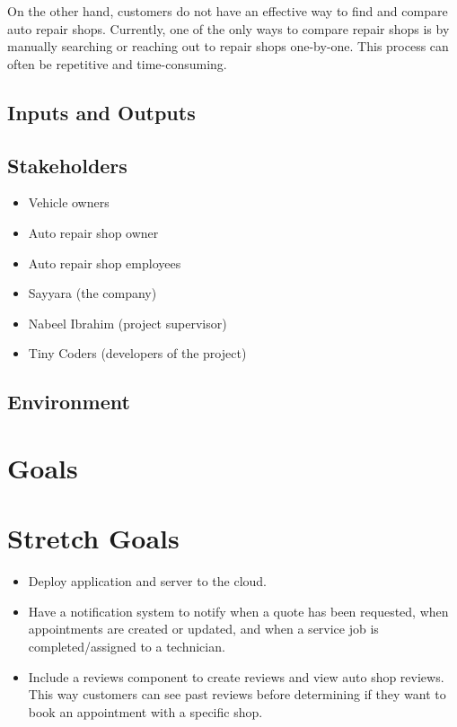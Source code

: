 \documentclass{article}
\begin{document}
On the other hand, customers do not have an effective way to find and compare auto repair shops.
Currently, one of the only ways to compare repair shops is by manually searching or reaching out to
repair shops one-by-one. This process can often be repetitive and time-consuming.

\subsection{Inputs and Outputs}


\subsection{Stakeholders}
\begin{itemize}
  \item Vehicle owners
  \item Auto repair shop owner
  \item Auto repair shop employees
  \item Sayyara (the company)
  \item Nabeel Ibrahim (project supervisor)
  \item Tiny Coders (developers of the project)
\end{itemize}

\subsection{Environment}


\section{Goals}

\section{Stretch Goals}
\begin{itemize}
  \item Deploy application and server to the cloud.
  \item Have a notification system to notify when a quote has been requested, when appointments are created
        or updated, and when a service job is completed/assigned to a technician.
  \item Include a reviews component to create reviews and view auto shop reviews. This way customers can
        see past reviews before determining if they want to book an appointment with a specific shop.
\end{itemize}
\end{document}
